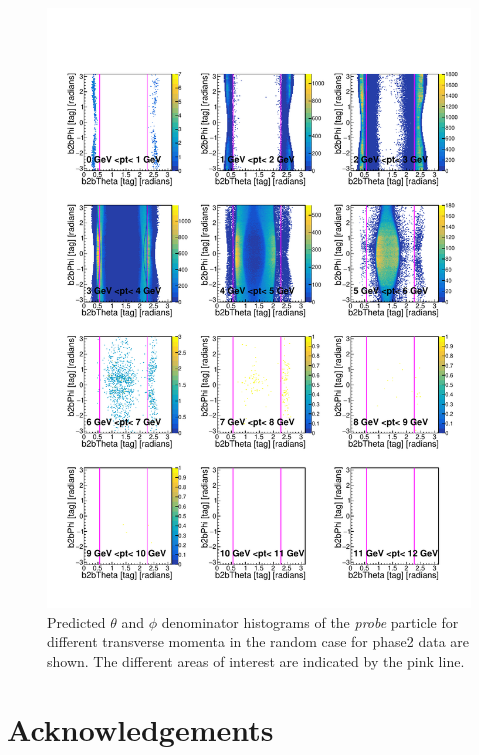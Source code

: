 \documentclass[a4paper,11pt,twosided,final,german,openbib,pdftex,listof=totoc,bibliography=totoc]{scrbook}
\begin{document}
\begin{appendix}
\begin{figure}[h!]
	\includegraphics[width=\textwidth]{Plots/RTPtMRandomD_Data.pdf}
	\caption{Predicted $\theta$ and $\phi$ denominator histograms of the \textit{probe} particle for different transverse momenta in the random case for phase2 data are shown. The different areas of interest are indicated by the pink line.}
	\label{plt:RTPtMRandomD_Data}
\end{figure}













\listoffigures
\listoftables

\nocite{*}
\printbibliography[title={Bibliography}]


\chapter{Acknowledgements}


\end{appendix}
\end{document}
